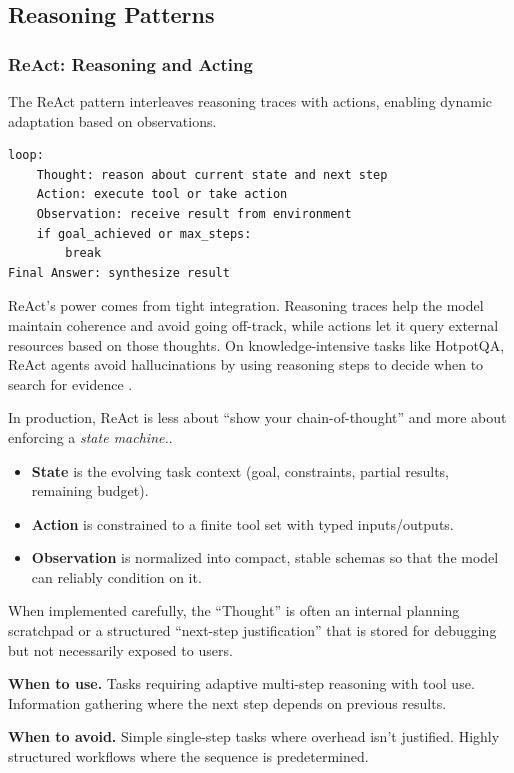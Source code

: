 \subsection{Reasoning Patterns}

\subsubsection{ReAct: Reasoning and Acting}

The ReAct pattern \cite{react2022} interleaves reasoning traces with actions, enabling dynamic adaptation based on observations.

\begin{verbatim}
loop:
    Thought: reason about current state and next step
    Action: execute tool or take action
    Observation: receive result from environment
    if goal_achieved or max_steps:
        break
Final Answer: synthesize result
\end{verbatim}

ReAct's power comes from tight integration. Reasoning traces help the model maintain coherence and avoid going off-track, while actions let it query external resources based on those thoughts. On knowledge-intensive tasks like HotpotQA, ReAct agents avoid hallucinations by using reasoning steps to decide when to search for evidence \cite{react2022}.

In production, ReAct is less about ``show your chain-of-thought'' and more about enforcing a \textit{state machine.}.
\begin{itemize}
\item \textbf{State} is the evolving task context (goal, constraints, partial results, remaining budget).
\item \textbf{Action} is constrained to a finite tool set with typed inputs/outputs.
\item \textbf{Observation} is normalized into compact, stable schemas so that the model can reliably condition on it.
\end{itemize}
When implemented carefully, the ``Thought'' is often an internal planning scratchpad or a structured ``next-step justification'' that is stored for debugging but not necessarily exposed to users.

\textbf{When to use.} Tasks requiring adaptive multi-step reasoning with tool use. Information gathering where the next step depends on previous results.

\textbf{When to avoid.} Simple single-step tasks where overhead isn't justified. Highly structured workflows where the sequence is predetermined.

